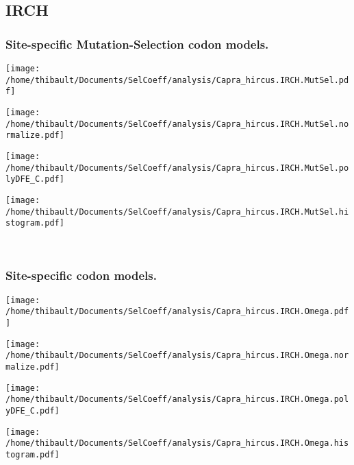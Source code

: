 \subsection{IRCH} 
 
\subsubsection*{Site-specific Mutation-Selection codon models.} 
\begin{minipage}{0.49\linewidth} 
\texttt{[image: /home/thibault/Documents/SelCoeff/analysis/Capra\_hircus.IRCH.MutSel.pdf]} 
\end{minipage}
\begin{minipage}{0.49\linewidth} 
\texttt{[image: /home/thibault/Documents/SelCoeff/analysis/Capra\_hircus.IRCH.MutSel.normalize.pdf]} 
\end{minipage}
\begin{minipage}{0.49\linewidth} 
\texttt{[image: /home/thibault/Documents/SelCoeff/analysis/Capra\_hircus.IRCH.MutSel.polyDFE\_C.pdf]} 
\end{minipage}
\begin{minipage}{0.49\linewidth} 
\texttt{[image: /home/thibault/Documents/SelCoeff/analysis/Capra\_hircus.IRCH.MutSel.histogram.pdf]} 
\end{minipage}
\\ 
\subsubsection*{Site-specific codon models.} 
\begin{minipage}{0.49\linewidth} 
\texttt{[image: /home/thibault/Documents/SelCoeff/analysis/Capra\_hircus.IRCH.Omega.pdf]} 
\end{minipage}
\begin{minipage}{0.49\linewidth} 
\texttt{[image: /home/thibault/Documents/SelCoeff/analysis/Capra\_hircus.IRCH.Omega.normalize.pdf]} 
\end{minipage}
\begin{minipage}{0.49\linewidth} 
\texttt{[image: /home/thibault/Documents/SelCoeff/analysis/Capra\_hircus.IRCH.Omega.polyDFE\_C.pdf]} 
\end{minipage}
\begin{minipage}{0.49\linewidth} 
\texttt{[image: /home/thibault/Documents/SelCoeff/analysis/Capra\_hircus.IRCH.Omega.histogram.pdf]} 
\end{minipage}
\\ 
